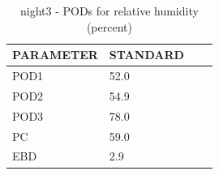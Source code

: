 \begin{table}[p!]
\begin{center}
\begin{tabular}{|l|l|l|l|}
\hline
\multicolumn{1}{|c|}{\cellcolor[HTML]{C0C0C0}\textbf{PARAMETER}} & \multicolumn{1}{c|}{\cellcolor[HTML]{C0C0C0}\textbf{STANDARD}} \\
\hline
\cellcolor[HTML]{C0C0C0}POD1  & 52.0                                \\
\cellcolor[HTML]{C0C0C0}POD2  & 54.9                                \\
\cellcolor[HTML]{C0C0C0}POD3  & 78.0                                \\
\cellcolor[HTML]{C0C0C0}PC    & 59.0                                  \\
\cellcolor[HTML]{C0C0C0}EBD   & 2.9                                 \\
\hline
\end{tabular}
\caption{night3 - PODs for relative humidity (percent)}
\label{tab:podrh:night3}
\end{center}
\end{table}
